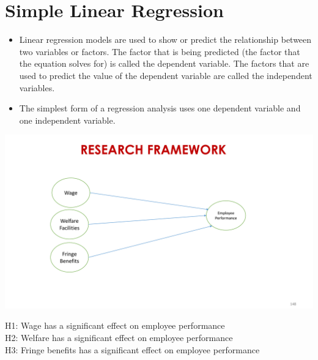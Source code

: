 \documentclass[
  letterpaper,
  DIV=11,
  numbers=noendperiod]{scrreprt}
\providecommand{\tightlist}{%
  \setlength{\itemsep}{0pt}\setlength{\parskip}{0pt}}\usepackage{longtable,booktabs,array}
\begin{document}
\section{Simple Linear Regression}\label{simple-linear-regression}

\begin{itemize}
\tightlist
\item
  Linear regression models are used to show or predict the relationship
  between two variables or factors. The factor that is being predicted
  (the factor that the equation solves for) is called the dependent
  variable. The factors that are used to predict the value of the
  dependent variable are called the independent variables.\\
\item
  The simplest form of a regression analysis uses one dependent variable
  and one independent variable.\\
\end{itemize}

\includegraphics{images/slides/img_Page_137.png}

\begin{tcolorbox}[enhanced jigsaw, rightrule=.15mm, arc=.35mm, colframe=quarto-callout-note-color-frame, coltitle=black, left=2mm, colbacktitle=quarto-callout-note-color!10!white, bottomtitle=1mm, titlerule=0mm, colback=white, breakable, opacitybacktitle=0.6, opacityback=0, toprule=.15mm, toptitle=1mm, title=\textcolor{quarto-callout-note-color}{\faInfo}\hspace{0.5em}{Hypothesis}, bottomrule=.15mm, leftrule=.75mm]

H1: Wage has a significant effect on employee performance\\
H2: Welfare has a significant effect on employee performance\\
H3: Fringe benefits has a significant effect on employee performance\\

\end{tcolorbox}
\end{document}
